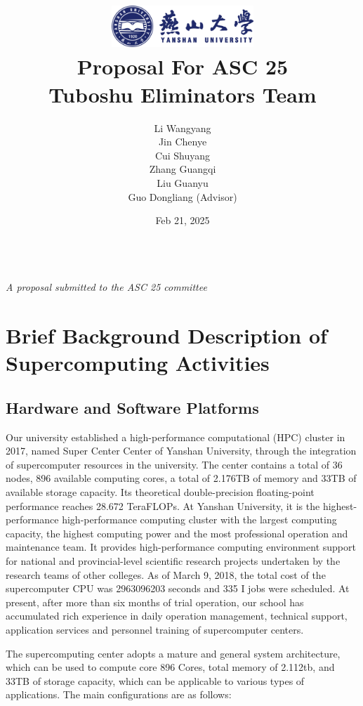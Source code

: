 \documentclass[a4paper,12pt]{article}
\title{
    \includegraphics[width=0.4\textwidth]{ysu-logo.png}\\[2cm] %
    {\LARGE \textbf {Proposal For ASC 25}}\\[0.5cm]
    \large Tuboshu Eliminators Team\\[1cm] %
}
\author{
    \begin{tabular}{c}
        \large Li Wangyang \\[0.15cm]
        \large Jin Chenye \\[0.15cm]
        \large Cui Shuyang \\[0.15cm]
        \large Zhang Guangqi \\[0.15cm]
        \large Liu Guanyu \\[0.15cm]
        \large Guo Dongliang (Advisor)
    \end{tabular}
}
\date{}
\begin{document}
\maketitle
\thispagestyle{empty}
\vfill
\begin{center}
    \date {\large {Feb 21, 2025}} \\[1cm]
    \textit{A proposal submitted to the ASC 25 committee}
\end{center}
\newpage

\tableofcontents
{}
\newpage

\section{Brief Background Description of Supercomputing Activities}

\subsection{Hardware and Software Platforms}

Our university established a high-performance computational (HPC) cluster in 2017, named Super Center Center of Yanshan University, through the integration of supercomputer resources in the university. The center contains a total of 36 nodes, 896 available computing cores, a total of 2.176TB of memory and 33TB of available storage capacity. Its theoretical double-precision floating-point performance reaches 28.672 TeraFLOPs. At Yanshan University, it is the highest-performance high-performance computing cluster with the largest computing capacity, the highest computing power and the most professional operation and maintenance team. It provides high-performance computing environment support for national and provincial-level scientific research projects undertaken by the research teams of other colleges. As of March 9, 2018, the total cost of the supercomputer CPU was 2963096203 seconds and 335 I jobs were scheduled. At present, after more than six months of trial operation, our school has accumulated rich experience in daily operation management, technical support, application services and personnel training of supercomputer centers.

The supercomputing center adopts a mature and general system architecture, which can be used to compute core 896 Cores, total memory of 2.112tb, and 33TB of storage capacity, which can be applicable to various types of applications. The main configurations are as follows:
\end{document}
